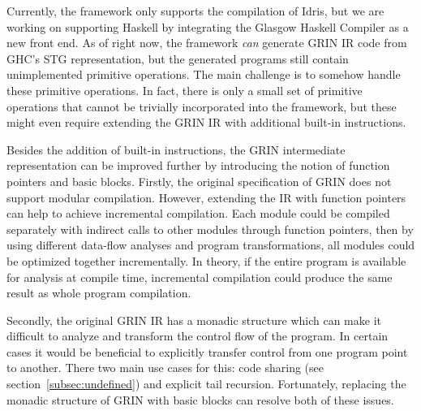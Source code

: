 \documentclass[main.tex]{subfiles}
\begin{document}
	
	Currently, the framework only supports the compilation of Idris, but we are working on supporting Haskell by integrating the Glasgow Haskell Compiler as a new front end. As of right now, the framework \emph{can} generate GRIN IR code from GHC's STG representation, but the generated programs still contain unimplemented primitive operations. The main challenge is to somehow handle these primitive operations. In fact, there is only a small set of primitive operations that cannot be trivially incorporated into the framework, but these might even require extending the GRIN IR with additional built-in instructions.
	
	Besides the addition of built-in instructions, the GRIN intermediate representation can be improved further by introducing the notion of function pointers and basic blocks. Firstly, the original specification of GRIN does not support modular compilation. However, extending the IR with function pointers can help to achieve incremental compilation. Each module could be compiled separately with indirect calls to other modules through function pointers, then by using different data-flow analyses and program transformations, all modules could be optimized together incrementally. In theory, if the entire program is available for analysis at compile time, incremental compilation could produce the same result as whole program compilation. 
	
	Secondly, the original GRIN IR has a monadic structure which can make it difficult to analyze and transform the control flow of the program. In certain cases it would be beneficial to explicitly transfer control from one program point to another. There two main use cases for this: code sharing (see section~\ref{subsec:undefined}) and explicit tail recursion. Fortunately, replacing the monadic structure of GRIN with basic blocks can resolve both of these issues.
	
\end{document}
